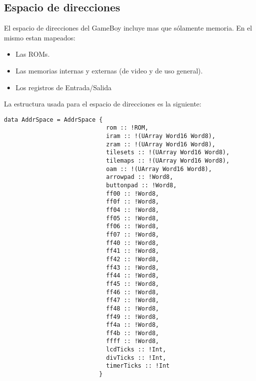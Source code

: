 \documentclass[a4paper,10pt]{report}
\begin{document}
\subsection*{Espacio de direcciones}
El espacio de direcciones del GameBoy incluye mas que sólamente memoria. En el mismo estan mapeados:
\begin{itemize}
  \item Las ROMs.
  \item Las memorias internas y externas (de video y de uso general).
  \item Los registros de Entrada/Salida
\end{itemize}
La estructura usada para el espacio de direcciones es la siguiente:
\begin{verbatim}
data AddrSpace = AddrSpace {
                             rom :: !ROM,
                             iram :: !(UArray Word16 Word8),
                             zram :: !(UArray Word16 Word8),
                             tilesets :: !(UArray Word16 Word8),
                             tilemaps :: !(UArray Word16 Word8), 
                             oam :: !(UArray Word16 Word8),
                             arrowpad :: !Word8,
                             buttonpad :: !Word8,
                             ff00 :: !Word8,
                             ff0f :: !Word8,
                             ff04 :: !Word8,
                             ff05 :: !Word8,
                             ff06 :: !Word8,
                             ff07 :: !Word8,
                             ff40 :: !Word8,
                             ff41 :: !Word8,
                             ff42 :: !Word8,
                             ff43 :: !Word8,
                             ff44 :: !Word8,
                             ff45 :: !Word8,
                             ff46 :: !Word8,
                             ff47 :: !Word8,
                             ff48 :: !Word8,
                             ff49 :: !Word8,
                             ff4a :: !Word8,
                             ff4b :: !Word8,
                             ffff :: !Word8,
                             lcdTicks :: !Int, 
                             divTicks :: !Int,
                             timerTicks :: !Int
                           }

\end{verbatim}
\end{document}
